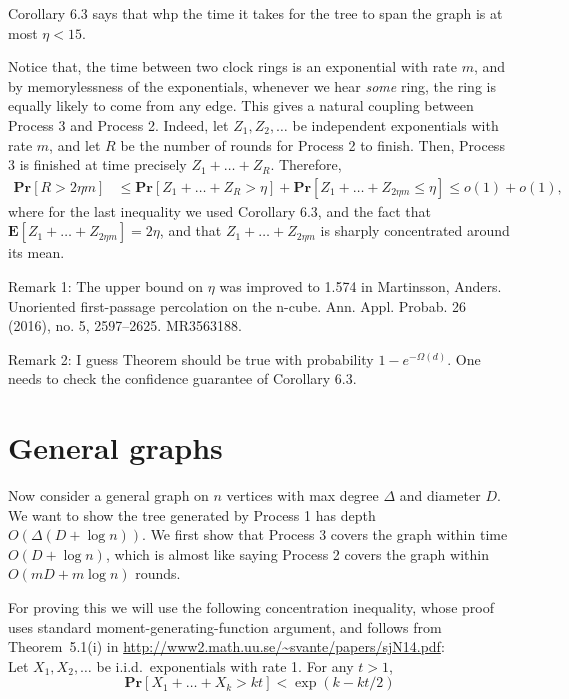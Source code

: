 \documentclass{article}
\begin{document}
Corollary 6.3 says that whp the time it takes for the tree to span the graph is at most $\eta <15$.

Notice that, the time between two clock rings is an exponential with rate $m$,
and by memorylessness of the exponentials, whenever we hear \emph{some} ring, the ring is equally likely to come from any edge.
This gives a natural coupling between Process 3 and Process 2.
Indeed, let $Z_1,Z_2,\dots$ be independent exponentials with rate $m$, and let $R$ be the number of rounds for Process 2 to finish.
Then, Process 3 is finished at time precisely
$Z_1 + \dots + Z_R$.
Therefore,
\begin{align*}
\mathbf{Pr} [ R > 2 \eta m ] & \leq 
\mathbf{Pr} [Z_1 + \dots + Z_R > \eta]+
\mathbf{Pr} [Z_1 + \dots + Z_{2\eta m} \leq \eta]
\leq o(1) + o(1),
\end{align*}
where for the last inequality we used Corollary 6.3,
and the fact that
$\mathbf{E}[Z_1 + \dots + Z_{2\eta m}]= 2\eta$,
and that 
$Z_1 + \dots + Z_{2\eta m}$ is sharply concentrated around its mean.

Remark 1:  
The upper bound on  $\eta$ was improved to 1.574
in
Martinsson, Anders. Unoriented first-passage percolation on the n-cube. Ann. Appl. Probab. 26 (2016), no. 5, 2597--2625. MR3563188.

Remark 2: I guess Theorem should be true with probability $1-e^{-\Omega(d)}$. One needs to check the confidence guarantee of Corollary 6.3.

\section{General graphs}

Now consider a general graph on $n$ vertices
with max degree $\Delta$ and diameter $D$.
We want to show the tree generated by Process 1
has depth $O(\Delta (D + \log n))$.
We first show that 
Process 3 covers the graph within time $O(D+\log n)$,
which is almost like saying 
Process 2 covers the graph within $O(m D+m\log n)$ rounds.

For proving this we will use the following concentration inequality, whose proof uses standard moment-generating-function argument, 
and follows from Theorem~5.1(i) in
\url{http://www2.math.uu.se/~svante/papers/sjN14.pdf}:\\
Let $X_1,X_2,\dots$ be i.i.d.\ exponentials with rate 1.
For any $t>1$,
$$\mathbf{Pr}[X_1+\dots+X_k > kt] < \exp (k- k t/2)  $$
\end{document}
